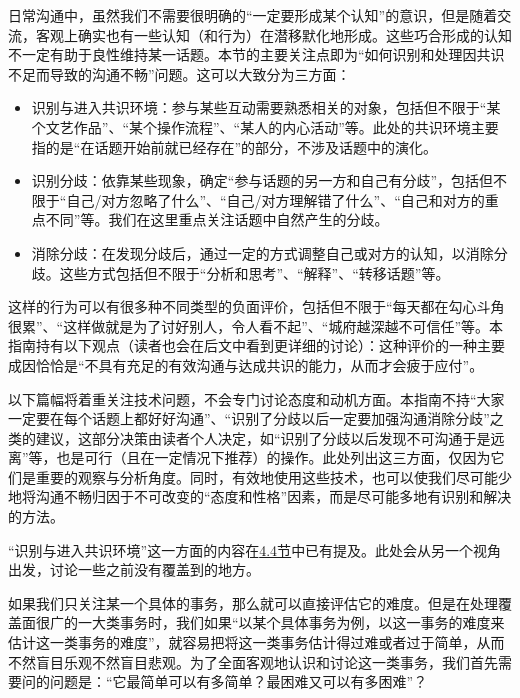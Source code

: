 日常沟通中，虽然我们不需要很明确的“一定要形成某个认知”的意识，但是随着交流，客观上确实也有一些认知（和行为）在潜移默化地形成。这些巧合形成的认知不一定有助于良性维持某一话题。本节的主要关注点即为“如何识别和处理因共识不足而导致的沟通不畅”问题。这可以大致分为三方面：
\begin{itemize}
\item 识别与进入共识环境：参与某些互动需要熟悉相关的对象，包括但不限于“某个文艺作品”、“某个操作流程”、“某人的内心活动”等。此处的共识环境主要指的是“在话题开始前就已经存在”的部分，不涉及话题中的演化。
\item 识别分歧：依靠某些现象，确定“参与话题的另一方和自己有分歧”，包括但不限于“自己/对方忽略了什么”、“自己/对方理解错了什么”、“自己和对方的重点不同”等。我们在这里重点关注话题中自然产生的分歧。
\item 消除分歧：在发现分歧后，通过一定的方式调整自己或对方的认知，以消除分歧。这些方式包括但不限于“分析和思考”、“解释”、“转移话题”等。
\end{itemize}
\begin{explain}
这样的行为可以有很多种不同类型的负面评价，包括但不限于“每天都在勾心斗角很累”、“这样做就是为了讨好别人，令人看不起”、“城府越深越不可信任”等。本指南持有以下观点（读者也会在后文中看到更详细的讨论）：这种评价的一种主要成因恰恰是“不具有充足的有效沟通与达成共识的能力，从而才会疲于应付”。

以下篇幅将着重关注技术问题，不会专门讨论态度和动机方面。本指南不持“大家一定要在每个话题上都好好沟通”、“识别了分歧以后一定要加强沟通消除分歧”之类的建议，这部分决策由读者个人决定，如“识别了分歧以后发现不可沟通于是远离”等，也是可行（且在一定情况下推荐）的操作。此处列出这三方面，仅因为它们是重要的观察与分析角度。同时，有效地使用这些技术，也可以使我们尽可能少地将沟通不畅归因于不可改变的“态度和性格”因素，而是尽可能多地有识别和解决的方法。
\end{explain}

\divider

“识别与进入共识环境”这一方面的内容在\hyperref[sec:解读]{4.4节}中已有提及。此处会从另一个视角出发，讨论一些之前没有覆盖到的地方。

如果我们只关注某一个具体的事务，那么就可以直接评估它的难度。但是在处理覆盖面很广的一大类事务时，我们如果“以某个具体事务为例，以这一事务的难度来估计这一类事务的难度”，就容易把将这一类事务估计得过难或者过于简单，从而不然盲目乐观不然盲目悲观。为了全面客观地认识和讨论这一类事务，我们首先需要问的问题是：“它最简单可以有多简单？最困难又可以有多困难”？

